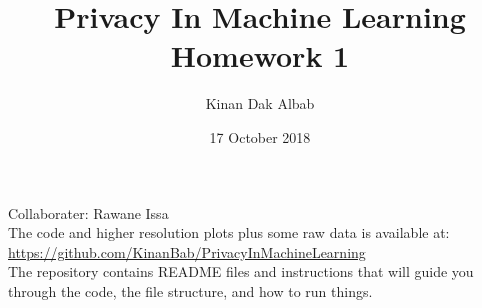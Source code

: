 \documentclass{article}
\title{Privacy In Machine Learning Homework 1}
\author{Kinan Dak Albab}
\date{17 October 2018}
\begin{document}
\maketitle

\noindent Collaborater: Rawane Issa \\

\noindent The code and higher resolution plots plus some raw data is available at:\\ \href{https://github.com/KinanBab/PrivacyInMachineLearning}{https://github.com/KinanBab/PrivacyInMachineLearning} \\

\noindent The repository contains README files and instructions that will guide you through the code, the file structure, and how to run things.






\end{document}
